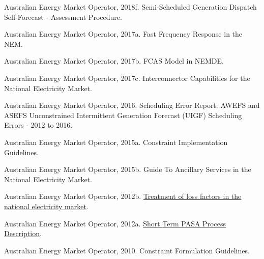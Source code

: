 \documentclass[12pt,a4paper,]{report}
\newlength{\cslhangindent}
\newenvironment{CSLReferences}[2] %
 {%
  \setlength{\parindent}{0pt}
  \ifodd #1 \everypar{\setlength{\hangindent}{\cslhangindent}}\ignorespaces\fi
  \ifnum #2 > 0
  \setlength{\parskip}{#2\baselineskip}
  \fi
 }%
 {}
\begin{document}
\begin{CSLReferences}{1}{0}
\leavevmode{}%
Australian Energy Market Operator, 2018f. Semi-{Scheduled Generation
Dispatch Self-Forecast} - {Assessment Procedure}.

\leavevmode{}%
Australian Energy Market Operator, 2017a. Fast {Frequency Response} in
the {NEM}.

\leavevmode{}%
Australian Energy Market Operator, 2017b. {FCAS Model} in {NEMDE}.

\leavevmode{}%
Australian Energy Market Operator, 2017c. Interconnector {Capabilities}
for the {National Electricity Market}.

\leavevmode{}%
Australian Energy Market Operator, 2016. Scheduling {Error Report}:
{AWEFS} and {ASEFS Unconstrained Intermittent Generation Forecast}
({UIGF}) {Scheduling Errors} - 2012 to 2016.

\leavevmode{}%
Australian Energy Market Operator, 2015a. Constraint {Implementation
Guidelines}.

\leavevmode{}%
Australian Energy Market Operator, 2015b. Guide {To Ancillary Services}
in the {National Electricity Market}.

\leavevmode{}%
Australian Energy Market Operator, 2012b.
\href{https://www.aemo.com.au/Electricity/National-Electricity-Market-NEM/Security-and-reliability/-/media/93BB87A6E1F141DBB7B0D02AFD902D4F.ashx}{Treatment
of loss factors in the national electricity market}.

\leavevmode{}%
Australian Energy Market Operator, 2012a.
\href{https://www.aemo.com.au/-/media/files/electricity/nem/planning_and_forecasting/pasa/stpasa-process-description.pdf}{Short
{Term PASA Process Description}}.

\leavevmode{}%
Australian Energy Market Operator, 2010. Constraint {Formulation
Guidelines}.


\end{CSLReferences}
\end{document}
